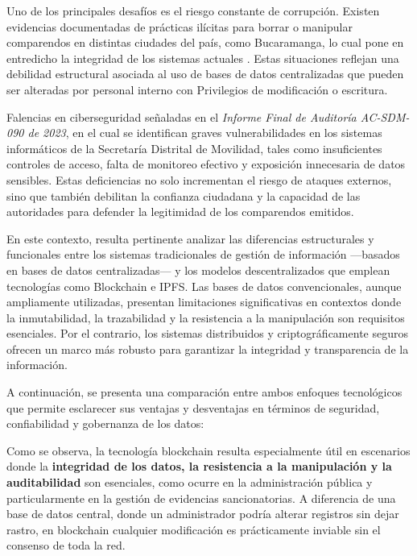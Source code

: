 \documentclass[
    letterpaper, 
    man,   
    spanish,
    12pt,
    donotrepeattitle,
    floatsintext,
    hidelinks %
]{apa7}
\begin{document}
Uno de los principales desafíos es el riesgo constante de corrupción. Existen evidencias documentadas de prácticas ilícitas para borrar o manipular comparendos en distintas ciudades del país, como Bucaramanga, lo cual pone en entredicho la integridad de los sistemas actuales \parencite{blogAletta,procuraduriaBucaramanga}. Estas situaciones reflejan una debilidad estructural asociada al uso de bases de datos centralizadas que pueden ser alteradas por personal interno con Privilegios de modificación o escritura.

Falencias en ciberseguridad señaladas en el \textit{Informe Final de Auditoría AC-SDM-090 de 2023}, en el cual se identifican graves vulnerabilidades en los sistemas informáticos de la Secretaría Distrital de Movilidad, tales como insuficientes controles de acceso, falta de monitoreo efectivo y exposición innecesaria de datos sensibles\parencite{auditoriaSDM}. Estas deficiencias no solo incrementan el riesgo de ataques externos, sino que también debilitan la confianza ciudadana y la capacidad de las autoridades para defender la legitimidad de los comparendos emitidos.

En este contexto, resulta pertinente analizar las diferencias estructurales y funcionales entre los sistemas tradicionales de gestión de información —basados en bases de datos centralizadas— y los modelos descentralizados que emplean tecnologías como Blockchain e IPFS. Las bases de datos convencionales, aunque ampliamente utilizadas, presentan limitaciones significativas en contextos donde la inmutabilidad, la trazabilidad y la resistencia a la manipulación son requisitos esenciales. Por el contrario, los sistemas distribuidos y criptográficamente seguros ofrecen un marco más robusto para garantizar la integridad y transparencia de la información.

A continuación, se presenta una comparación entre ambos enfoques tecnológicos que permite esclarecer sus ventajas y desventajas en términos de seguridad, confiabilidad y gobernanza de los datos:



Como se observa, la tecnología blockchain resulta especialmente útil en escenarios donde la \textbf{integridad de los datos, la resistencia a la manipulación y la auditabilidad} son esenciales, como ocurre en la administración pública y particularmente en la gestión de evidencias sancionatorias. A diferencia de una base de datos central, donde un administrador podría alterar registros sin dejar rastro, en blockchain cualquier modificación es prácticamente inviable sin el consenso de toda la red.
\end{document}
